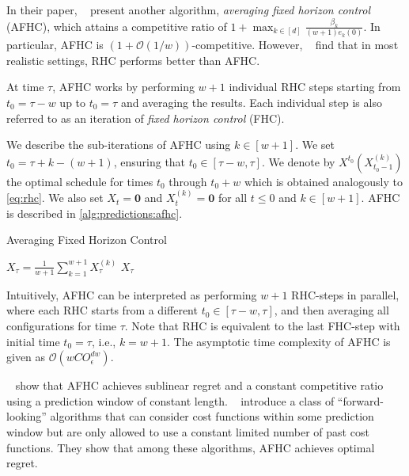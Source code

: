 In their paper, \citeauthor*{Lin2012}~\cite{Lin2012} present another algorithm, \emph{averaging fixed horizon control} (AFHC), which attains a competitive ratio of $1 + \max_{k \in [d]} \frac{\beta_k}{(w+1) e_k(0)}$. In particular, AFHC is $(1 + \mathcal{O}(1/w))$-competitive. However, \citeauthor*{Lin2012}~\cite{Lin2012} find that in most realistic settings, RHC performs better than AFHC.

At time $\tau$, AFHC works by performing $w + 1$ individual RHC steps starting from $t_0 = \tau-w$ up to $t_0 = \tau$ and averaging the results. Each individual step is also referred to as an iteration of \emph{fixed horizon control} (FHC).

We describe the sub-iterations of AFHC using $k \in [w+1]$. We set $t_0 = \tau+k-(w+1)$, ensuring that $t_0 \in [\tau-w,\tau]$. We denote by $X^{t_0}(X_{t_0-1}^{(k)})$ the optimal schedule for times $t_0$ through $t_0+w$ which is obtained analogously to \cref{eq:rhc}. We also set $X_t = \mathbf{0}$ and $X_t^{(k)} = \mathbf{0}$ for all $t \leq 0$ and $k \in [w+1]$. AFHC is described in \cref{alg:predictions:afhc}.

\begin{algorithm}
    \caption{Averaging Fixed Horizon Control~\cite{Lin2012}}\label{alg:predictions:afhc}
    $X_{\tau} = \frac{1}{w+1} \sum_{k=1}^{w+1} X_{\tau}^{(k)}$\;
    \Return $X_{\tau}$\;
\end{algorithm}

Intuitively, AFHC can be interpreted as performing $w+1$ RHC-steps in parallel, where each RHC starts from a different $t_0 \in [\tau-w,\tau]$, and then averaging all configurations for time $\tau$. Note that RHC is equivalent to the last FHC-step with initial time $t_0 = \tau$, i.e., $k = w+1$. The asymptotic time complexity of AFHC is given as $\mathcal{O}(w C O_{\epsilon}^{dw})$.

\citeauthor*{Chen2015}~\cite{Chen2015} show that AFHC achieves sublinear regret and a constant competitive ratio using a prediction window of constant length. \citeauthor*{Badiei2015}~\cite{Badiei2015} introduce a class of ``forward-looking'' algorithms that can consider cost functions within some prediction window but are only allowed to use a constant limited number of past cost functions. They show that among these algorithms, AFHC achieves optimal regret.

